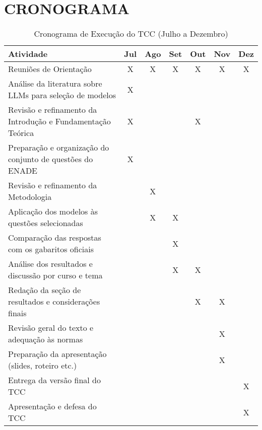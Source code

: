 \section{CRONOGRAMA}
\begin{table}[ht]
\centering
\caption{Cronograma de Execução do TCC (Julho a Dezembro)}
\begin{tabular}{|p{9cm}|c|c|c|c|c|c|}
\hline
\textbf{Atividade} & \textbf{Jul} & \textbf{Ago} & \textbf{Set} & \textbf{Out} & \textbf{Nov} & \textbf{Dez} \\
\hline
Reuniões de Orientação & X & X & X & X & X & X \\
\hline
Análise da literatura sobre LLMs para seleção de modelos & X &  &   &   &   &   \\
\hline
Revisão e refinamento da Introdução e Fundamentação Teórica & X &  &  & X &  &   \\
\hline
Preparação e organização do conjunto de questões do ENADE & X &  &   &   &   &   \\
\hline
Revisão e refinamento da Metodologia &  & X &  &  &  &   \\
\hline
Aplicação dos modelos às questões selecionadas &   & X & X &   &   &   \\
\hline
Comparação das respostas com os gabaritos oficiais &   &   & X &   &   &   \\
\hline
Análise dos resultados e discussão por curso e tema &   &   & X & X &   &   \\
\hline
Redação da seção de resultados e considerações finais &   &   &   & X & X &   \\
\hline
Revisão geral do texto e adequação às normas &   &   &   &   & X &   \\
\hline
Preparação da apresentação (slides, roteiro etc.) &   &   &   &   & X &   \\
\hline
Entrega da versão final do TCC &   &   &   &   &   & X \\
\hline
Apresentação e defesa do TCC &   &   &   &   &   & X \\
\hline
\end{tabular}
\end{table}



